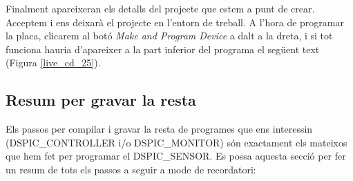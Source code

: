 

Finalment apareixeran els detalls del projecte que estem a punt de crear.
Acceptem i ens deixarà el projecte en l'entorn de treball.
A l'hora de programar la placa, clicarem al botó \emph{Make and Program Device} a dalt a la dreta, i si tot funciona hauria d'apareixer a la part inferior del programa el següent text (Figura \ref {live_cd_25}).


\clearpage

\subsection{Resum per gravar la resta}\label{cap:gui:cd:comp:save:all}

Els passos per compilar i gravar la resta de programes que ens interessin (DSPIC\_CONTROLLER i/o DSPIC\_MONITOR) són exactament els mateixos que hem fet per programar el DSPIC\_SENSOR.
Es possa aquesta secció per fer un resum de tots els passos a seguir a mode de recordatori:

